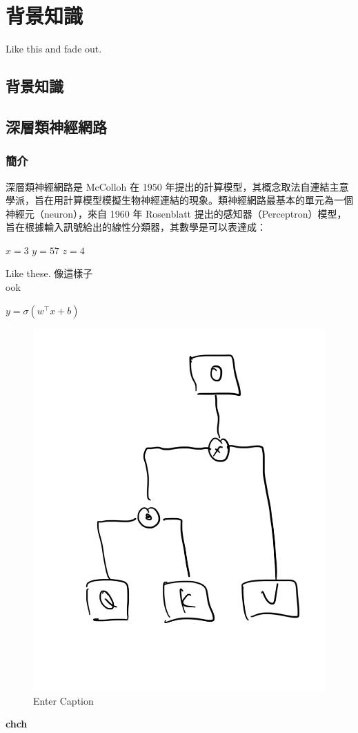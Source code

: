 \chapter{背景知識}
Like this \cite{726791, baevski2020wav2vec} and fade out.

\section{背景知識}

\section{深層類神經網路}

\subsection{簡介}

深層類神經網路是 McColloh 在 1950 年提出的計算模型，其概念取法自連結主意學派，旨在用計算模型模擬生物神經連結的現象。類神經網路最基本的單元為一個神經元（neuron），來自 1960 年 Rosenblatt 提出的感知器（Perceptron）模型，旨在根據輸入訊號給出的線性分類器，其數學是可以表達成：

$ x = 3 $
\( y = 57 \)
\( z = 4 \)

Like these. 像這樣子 \\
ook

$y=\sigma(w^\top x + b) $

\begin{figure}
    \centering
    \includegraphics[width=0.5\linewidth]{figures/Yy.png}
    \caption{Enter Caption}
    \label{fig:enter-label}
\end{figure}


\textbf{chch}

